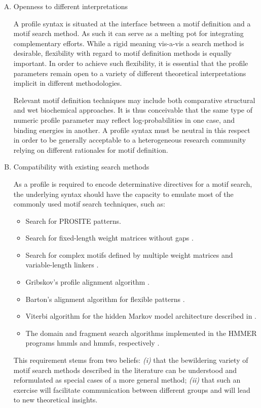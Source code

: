\documentclass[a4paper,10pt,twoside]{scrartcl}
\begin{document}
\begin{enumerate}[(A)]
    \item Openness to different interpretations

      A profile syntax is situated at the interface between a motif definition and a motif search method. As such it can serve as a melting pot for
      integrating complementary efforts. While a rigid meaning vis-a-vis a search method is desirable, flexibility with regard to motif definition
      methods is equally important. In order to achieve such flexibility, it is essential that the profile parameters remain open to a variety of different
      theoretical interpretations implicit in different methodologies.

      Relevant motif definition techniques may include both comparative structural and wet biochemical approaches. It is thus conceivable that the
      same type of numeric profile parameter may reflect log-probabilities in
      one case, and binding energies in another. A profile syntax must be neutral in this respect in order to be generally acceptable to a heterogeneous
      research community relying on different rationales for motif definition.

    \item Compatibility with existing search methods

      As a profile is required to encode determinative directives for a motif search, the underlying syntax should have the capacity to emulate most of
      the commonly used motif search techniques, such as:
      \begin{itemize}
	\item Search for PROSITE patterns.
	\item Search for fixed-length weight matrices without gaps \cite{Staden90}.
	\item Search for complex motifs defined by multiple weight matrices and variable-length linkers \cite{Mulligan84}.
	\item Gribskov's profile alignment algorithm \cite{Gribskov90}.
	\item Barton's alignment algorithm for flexible patterns \cite{Barton90}.
	\item Viterbi algorithm for the hidden Markov model architecture described in \cite{Krogh94}.
	\item The domain and fragment search algorithms implemented in the HMMER programs hmmls and hmmfs, respectively \cite{Eddy96}.
      \end{itemize}
  
      This requirement stems from two beliefs: \textit{(i)} that the bewildering variety of motif search methods described in the literature can be understood and
      reformulated as special cases of a more general method; \textit{(ii)} that such an exercise will facilitate communication between different groups and will
      lead to new theoretical insights.


\end{enumerate}
\end{document}
